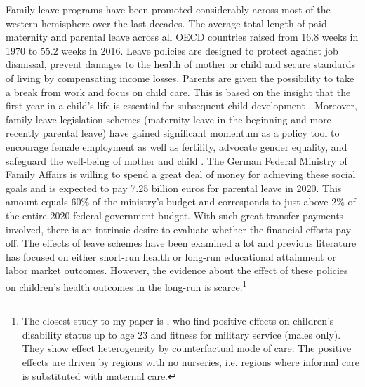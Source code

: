 \documentclass[11pt, a4paper]{article} %
\begin{document}
Family leave programs have been promoted considerably across most of the western hemisphere over the last decades. The average total length of paid maternity and parental leave across all OECD countries raised from 16.8 weeks in 1970 to 55.2 weeks in 2016. Leave policies are designed to protect against job dismissal, prevent damages to the health of mother or child and secure standards of living by compensating income losses. Parents are given the possibility to take a break from work and focus on child care. This is based on the insight that the first year in a child's life is essential for subsequent child development \citep{currie2011human}. Moreover, family leave legislation schemes (maternity leave in the beginning and more recently parental leave) have gained significant momentum as a policy tool to encourage female employment as well as fertility, advocate gender equality, and safeguard the well-being of mother and child \citep{blau2013, RafaelLaliveandJosefZweimuller2009, butikofer2018impact}. The German Federal Ministry of Family Affairs is willing to spend a great deal of money for achieving these social goals and is expected to pay 7.25 billion euros for parental leave in 2020. This amount equals 60\% of the ministry's budget and corresponds to just above 2\% of the entire 2020 federal government budget. With such great transfer payments involved, there is an intrinsic desire to evaluate whether the financial efforts pay off. The effects of leave schemes have been examined a lot and previous literature has focused on either short-run health or long-run educational attainment or labor market outcomes. However, the evidence about the effect of these policies on children's health outcomes in the long-run is scarce.\footnote{The closest study to my paper is \cite{danzer2019parental}, who find positive effects on children's disability status up to age 23 and fitness for military service (males only). They show effect heterogeneity by counterfactual mode of care: The positive effects are driven by regions with no nurseries, i.e. regions where informal care is substituted with maternal care.}\newline
\end{document}
